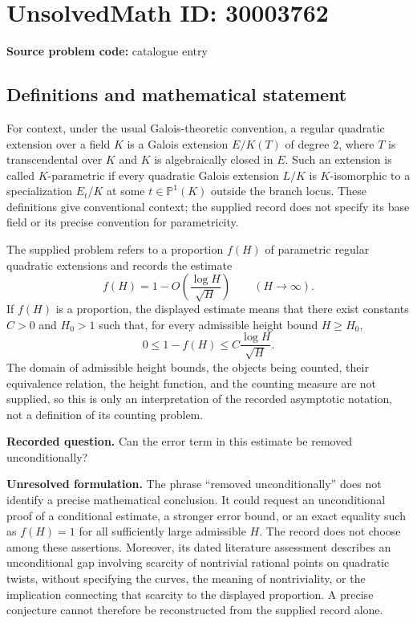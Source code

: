 \documentclass[11pt]{article}
\begin{document}
\section*{UnsolvedMath ID: 30003762}
\textbf{Source problem code:} catalogue entry
\subsection{Definitions and mathematical statement}
For context, under the usual Galois-theoretic convention, a regular quadratic extension over a field \(K\) is a Galois extension \(E/K(T)\) of degree \(2\), where \(T\) is transcendental over \(K\) and \(K\) is algebraically closed in \(E\). Such an extension is called \(K\)-parametric if every quadratic Galois extension \(L/K\) is \(K\)-isomorphic to a specialization \(E_t/K\) at some \(t\in\mathbb{P}^{1}(K)\) outside the branch locus. These definitions give conventional context; the supplied record does not specify its base field or its precise convention for parametricity.

The supplied problem refers to a proportion \(f(H)\) of parametric regular quadratic extensions and records the estimate
\[
f(H)=1-O\!\left(\frac{\log H}{\sqrt H}\right)
\qquad(H\to\infty).
\]
If \(f(H)\) is a proportion, the displayed estimate means that there exist constants \(C>0\) and \(H_0>1\) such that, for every admissible height bound \(H\ge H_0\),
\[
0\le 1-f(H)\le C\frac{\log H}{\sqrt H}.
\]
The domain of admissible height bounds, the objects being counted, their equivalence relation, the height function, and the counting measure are not supplied, so this is only an interpretation of the recorded asymptotic notation, not a definition of its counting problem.

\textbf{Recorded question.} Can the error term in this estimate be removed unconditionally?

\textbf{Unresolved formulation.} The phrase ``removed unconditionally'' does not identify a precise mathematical conclusion. It could request an unconditional proof of a conditional estimate, a stronger error bound, or an exact equality such as \(f(H)=1\) for all sufficiently large admissible \(H\). The record does not choose among these assertions. Moreover, its dated literature assessment describes an unconditional gap involving scarcity of nontrivial rational points on quadratic twists, without specifying the curves, the meaning of nontriviality, or the implication connecting that scarcity to the displayed proportion. A precise conjecture cannot therefore be reconstructed from the supplied record alone.
\end{document}
